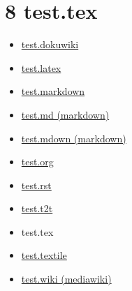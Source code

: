 \section{8 test.tex}

\begin{itemize}
\item \href{#0}{test.dokuwiki}
\item \href{#1}{test.latex}
\item \href{#2}{test.markdown}
\item \href{#3}{test.md (markdown)}
\item \href{#4}{test.mdown (markdown)}
\item \href{#5}{test.org}
\item \href{#6}{test.rst}
\item \href{#7}{test.t2t}
\item test.tex
\item \href{#9}{test.textile}
\item \href{#10}{test.wiki (mediawiki)}
\end{itemize}
